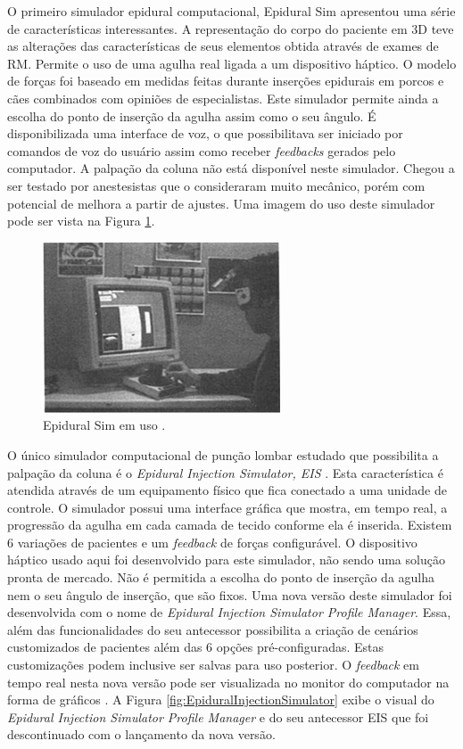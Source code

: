 O primeiro simulador epidural computacional, Epidural Sim \cite{Stredney1996} apresentou uma série de características interessantes. A representação do corpo do paciente em 3D teve as alterações das características de seus elementos obtida através de exames de \acrfull{RM}. Permite o uso de uma agulha real ligada a um dispositivo háptico. O modelo de forças foi baseado em medidas feitas durante inserções epidurais em porcos e cães combinados com opiniões de especialistas. Este simulador permite ainda a escolha do ponto de inserção da agulha assim como o seu ângulo. É disponibilizada uma interface de voz, o que possibilitava ser iniciado por comandos de voz do usuário assim como receber \textit{feedbacks} gerados pelo computador. A palpação da coluna não está disponível neste simulador. Chegou a ser testado por anestesistas que o consideraram muito mecânico, porém com potencial de melhora a partir de ajustes. Uma imagem do uso deste simulador pode ser vista na Figura \ref{fig:epiduralSim}. 

\begin{figure}[ht!]
    \centering
    \includegraphics[width=0.3\linewidth]{capitulos/figuras/epiduralSimulator.png} 
    \caption{Epidural Sim em uso \cite{Stredney1996}.}
    \label{fig:epiduralSim}
\end{figure}

O único simulador computacional de punção lombar estudado que possibilita a palpação da coluna é o \textit{Epidural Injection Simulator, EIS} \cite{Wilson2003}. Esta característica é atendida através de um equipamento físico que fica conectado a uma unidade de controle. O simulador possui uma interface gráfica que mostra, em tempo real, a progressão da agulha em cada camada de tecido conforme ela é inserida. Existem 6 variações de pacientes e um \textit{feedback} de forças configurável. O dispositivo háptico usado aqui foi desenvolvido para este simulador, não sendo uma solução pronta de mercado. Não é permitida a escolha do ponto de inserção da agulha nem o seu ângulo de inserção, que são fixos. Uma nova versão deste simulador foi desenvolvida com o nome de \textit{Epidural Injection Simulator Profile Manager}. Essa, além das funcionalidades do seu antecessor possibilita a criação de cenários customizados de pacientes além das 6 opções pré-configuradas. Estas customizações podem inclusive ser salvas para uso posterior. O \textit{feedback} em tempo real nesta nova versão pode ser visualizada no monitor do computador na forma de gráficos \cite{CPRSavers&FirstAidSupply2018}. A Figura \ref{fig:EpiduralInjectionSimulator} exibe o visual do \textit{Epidural Injection Simulator Profile Manager} e do seu antecessor EIS que foi descontinuado com o lançamento da nova versão.

